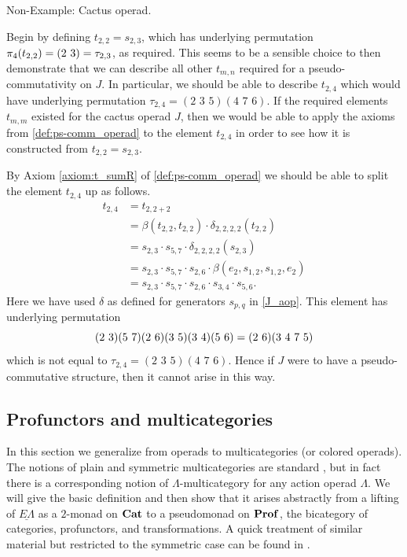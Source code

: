 \begin{example}
Non-Example: Cactus operad.

Begin by defining $t_{2,2} = s_{2,3}$, which has underlying permutation $\pi_4(t_{2,2}) = ( 2 \, \, 3 ) = \tau_{2,3}$, as required. This seems to be a sensible choice to then demonstrate that we can describe all other $t_{m,n}$ required for a pseudo-commutativity on $J$. In particular, we should be able to describe $t_{2,4}$ which would have underlying permutation $\tau_{2,4} = (2 \,\, 3 \,\, 5)(4 \,\, 7 \,\, 6)$. If the required elements $t_{m,m}$ existed for the cactus operad $J$, then we would be able to apply the axioms from \cref{def:ps-comm_operad} to the element $t_{2,4}$ in order to see how it is constructed from $t_{2,2} = s_{2,3}$.

By Axiom \ref{axiom:t_sumR} of \cref{def:ps-comm_operad} we should be able to split the element $t_{2,4}$ up as follows.
  \begin{align*}
    t_{2,4} &= t_{2,2+2} \\
    &= \beta(t_{2,2},t_{2,2}) \cdot \delta_{2,2,2,2}(t_{2,2}) \\
    &= s_{2,3} \cdot s_{5,7} \cdot \delta_{2,2,2,2}(s_{2,3}) \\
    &= s_{2,3} \cdot s_{5,7} \cdot s_{2,6} \cdot \beta(e_2,s_{1,2},s_{1,2},e_2) \\
    &= s_{2,3} \cdot s_{5,7} \cdot s_{2,6} \cdot s_{3,4} \cdot s_{5,6}.
  \end{align*}
Here we have used $\delta$ as defined for generators $s_{p,q}$ in \cref{J_aop}. This element has underlying permutation
  \[
      ( 2 \, \, 3 )( 5 \, \, 7 )( 2 \, \, 6 )( 3 \, \, 5 )( 3 \, \, 4 )( 5 \, \, 6 ) = ( 2 \, \, 6 )(3 \,\, 4 \,\, 7 \,\,5)
  \]
which is not equal to $\tau_{2,4} = (2 \,\, 3 \,\, 5)(4 \,\, 7 \,\, 6)$. Hence if $J$ were to have a pseudo-commutative structure, then it cannot arise in this way.
\end{example}
\subsection{Profunctors and multicategories}
In this section we generalize from operads to multicategories (or colored operads). The notions of plain and symmetric multicategories are standard \cite{bd_hda3}, but in fact there is a corresponding notion of $\Lambda$-multicategory for any action operad $\Lambda$. We will give the basic definition and then show that it arises abstractly from a lifting of $\underline{E\Lambda}$ as a $2$-monad  on $\mathbf{Cat}$ to a pseudomonad on $\mathbf{Prof}$, the bicategory of categories, profunctors, and transformations. A quick treatment of similar material but restricted to the symmetric case can be found in \cite{garner_poly}.


